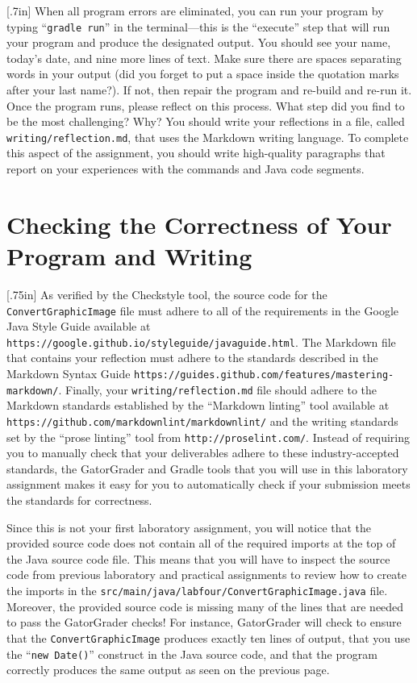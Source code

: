 \documentclass[11pt]{article}
\newcommand{\mainprogram}{\lstinline{ConvertGraphicImage}}
\newcommand{\mainprogramsource}{\lstinline{src/main/java/labfour/ConvertGraphicImage.java}}
\newcommand{\reflection}{\lstinline{writing/reflection.md}}
\newcommand{\gradlerun}{\command{gradle run}}
\newcommand{\command}[1]{``\lstinline{#1}''}
\newcommand{\url}[1]{\lstinline{#1}}
\newcommand{\step}[1]{``{#1}''}
\newcommand{\resource}[1]{\null\hfill\LARGE{\faLink{}}\newline\scriptsize{\em{#1}}}
\newcommand{\think}[1]{\null\hfill\LARGE{\faCogs{}}\newline\scriptsize{\em{#1}}}
\begin{document}
\marginnote{\think{Reflect on challenges}}[.7in] When all program errors are
eliminated, you can run your program by typing \gradlerun{} in the
terminal---this is the ``execute'' step that will run your program and produce
the designated output. You should see your name, today's date, and nine more
lines of text. Make sure there are spaces separating words in your output (did
you forget to put a space inside the quotation marks after your last name?). If
not, then repair the program and re-build and re-run it. Once the program runs,
please reflect on this process. What step did you find to be the most
challenging? Why? You should write your reflections in a file, called
\reflection{}, that uses the Markdown writing language. To complete this aspect
of the assignment, you should write high-quality paragraphs that report on your
experiences with the commands and Java code segments.

\section*{Checking the Correctness of Your Program and Writing}

\marginnote{\resource{Study style guides}}[.75in] As verified by the Checkstyle
tool, the source code for the \mainprogram{} file must adhere to all of the
requirements in the Google Java Style Guide available at
\url{https://google.github.io/styleguide/javaguide.html}. The Markdown file that
contains your reflection must adhere to the standards described in the Markdown
Syntax Guide \url{https://guides.github.com/features/mastering-markdown/}.
Finally, your \reflection{} file should adhere to the Markdown standards
established by the \step{Markdown linting} tool available at
\url{https://github.com/markdownlint/markdownlint/} and the writing standards
set by the \step{prose linting} tool from \url{http://proselint.com/}. Instead
of requiring you to manually check that your deliverables adhere to these
industry-accepted standards, the GatorGrader and Gradle tools that you will use
in this laboratory assignment makes it easy for you to automatically check if
your submission meets the standards for correctness.

Since this is not your first laboratory assignment, you will notice that the
provided source code does not contain all of the required imports at the top of
the Java source code file. This means that you will have to inspect the source
code from previous laboratory and practical assignments to review how to create
the imports in the \mainprogramsource{} file. Moreover, the provided source code
is missing many of the lines that are needed to pass the GatorGrader checks! For
instance, GatorGrader will check to ensure that the \mainprogram{} produces
exactly ten lines of output, that you use the \command{new Date()} construct in
the Java source code, and that the program correctly produces the same output as
seen on the previous page.
\end{document}
